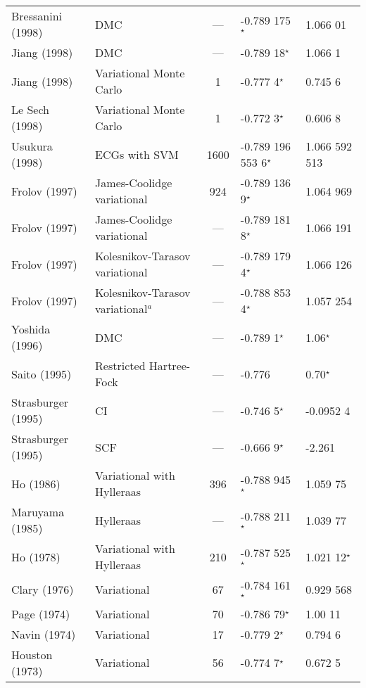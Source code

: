 \documentclass[Dissertation.tex]{subfiles}
\begin{document}
\begin{center}
\begin{longtable}{l l c l l}
Bressanini (1998) \cite{Bressanini1998} & DMC & --- & -0.789 175$^\star$ & 1.066 01 \\
Jiang (1998) \cite{Jiang1998} & DMC & --- & -0.789 18$^\star$ & 1.066 1 \\
Jiang (1998) \cite{Jiang1998} & Variational Monte Carlo & 1 & -0.777 4$^\star$ & 0.745 6 \\
Le Sech (1998) \cite{LeSech1998} & Variational Monte Carlo & 1 & -0.772 3$^\star$ & 0.606 8 \\
Usukura (1998) \cite{Usukura1998} & ECGs with SVM & 1600 & -0.789 196 553 6$^\star$ & 1.066 592 513 \\
Frolov (1997) \cite{Frolov1997a} & James-Coolidge variational & 924 & -0.789 136 9$^\star$ & 1.064 969 \\
Frolov (1997) \cite{Frolov1997a} & James-Coolidge variational & --- & -0.789 181 8$^\star$ & 1.066 191 \\
Frolov (1997) \cite{Frolov1997c} & Kolesnikov-Tarasov variational & --- & -0.789 179 4$^\star$ & 1.066 126 \\
Frolov (1997) \cite{Frolov1997c} & Kolesnikov-Tarasov variational$^a$ & --- & -0.788 853 4$^\star$ & 1.057 254 \\
Yoshida (1996) \cite{Yoshida1996} & DMC & --- & -0.789 1$^\star$ & 1.06$^\star$ \\
Saito (1995) \cite{Saito1995} & Restricted Hartree-Fock & --- & -0.776 & 0.70$^\star$ \\
Strasburger (1995) \cite{Strasburger1995} & CI & --- & -0.746 5$^\star$ & -0.0952 4 \\
Strasburger (1995) \cite{Strasburger1995} & SCF & --- & -0.666 9$^\star$ & -2.261 \\
Ho (1986) \cite{Ho1986} & Variational with Hylleraas & 396 & -0.788 945$^\star$ & 1.059 75 \\*
Maruyama (1985) \cite{Maruyama1985,Saito2003a} & Hylleraas & --- & -0.788 211$^\star$ & 1.039 77 \\*
Ho (1978) \cite{Ho1978} & Variational with Hylleraas & 210 & -0.787 525$^\star$ & 1.021 12$^\star$ \\*
Clary (1976) \cite{Clary1976} & Variational & 67 & -0.784 161$^\star$ & 0.929 568 \\*
Page (1974) \cite{Page1974} & Variational & 70 & -0.786 79$^\star$ & 1.00 11 \\*
Navin (1974) \cite{Navin1974} & Variational & 17 & -0.779 2$^\star$ & 0.794 6 \\*
Houston (1973) \cite{Houston1973} & Variational & 56 & -0.774 7$^\star$ & 0.672 5 \\*

\end{longtable}
\end{center}
\end{document}
